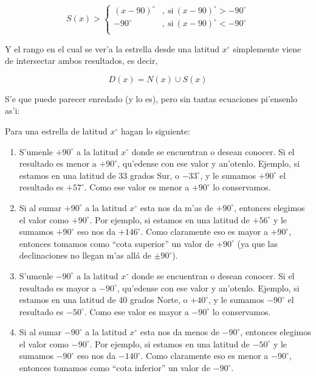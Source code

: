 \documentclass{article}
\begin{document}
\begin{enumerate}[a)]
\begin{enumerate} [i)]
\[ S(x) > \begin{cases} 
      (x-90)^\circ & , \ \text{si} \  (x-90)^\circ > -90^\circ \\
      -90^\circ & , \ \text{si} \  (x-90)^\circ < -90^\circ \\
   \end{cases}
\]

Y el rango en el cual se ver'a la estrella desde una latitud $x^\circ$ simplemente viene de intersectar ambos resultados, es decir,

\begin{equation}
D(x) = N(x) \cup S(x)
\end{equation}


S'e que puede parecer enredado (y lo es), pero sin tantas ecuaciones pi'ensenlo as'i:

Para una estrella de latitud $x^\circ$ hagan lo siguiente:

\begin{enumerate} [1)]
\item S'umenle $+90^\circ$ a la latitud $x^\circ$ donde se encuentran o desean conocer. Si el resultado es menor a $+90^\circ$, qu'edense con ese valor y an'otenlo. Ejemplo, si estamos en una latitud de 33 grados Sur, o $-33^\circ$, y le sumamos $+90^\circ$  el resultado es $+57^\circ$. Como ese valor es menor a $+90^\circ$ lo conservamos.

\item Si al sumar $+90^\circ$ a la latitud $x^\circ$ esta nos da m'as de $+90^\circ$, entonces elegimos el valor como $+90^\circ$. Por ejemplo, si estamos en una latitud de $+56^\circ$ y le sumamos $+90^\circ$ eso nos da $+146^\circ$. Como claramente eso es mayor a $+90^\circ$, entonces tomamos como ``cota superior'' un valor de $+90^\circ$ (ya que las declinaciones no llegan m'as allá de $\pm 90^\circ$).

\item S'umenle $-90^\circ$ a la latitud $x^\circ$ donde se encuentran o desean conocer. Si el resultado es mayor a $-90^\circ$, qu'edense con ese valor y an'otenlo. Ejemplo, si estamos en una latitud de 40 grados Norte, o $+40^\circ$, y le sumamos $-90^\circ$  el resultado es $-50^\circ$. Como ese valor es mayor a $-90^\circ$ lo conservamos.

\item Si al sumar $-90^\circ$ a la latitud $x^\circ$ esta nos da menos de $-90^\circ$, entonces elegimos el valor como $-90^\circ$. Por ejemplo, si estamos en una latitud de $-50^\circ$ y le sumamos $-90^\circ$ eso nos da $-140^\circ$. Como claramente eso es menor a $-90^\circ$, entonces tomamos como ``cota inferior'' un valor de $-90^\circ$.


\end{enumerate}
\end{enumerate}
\end{enumerate}
\end{document}
